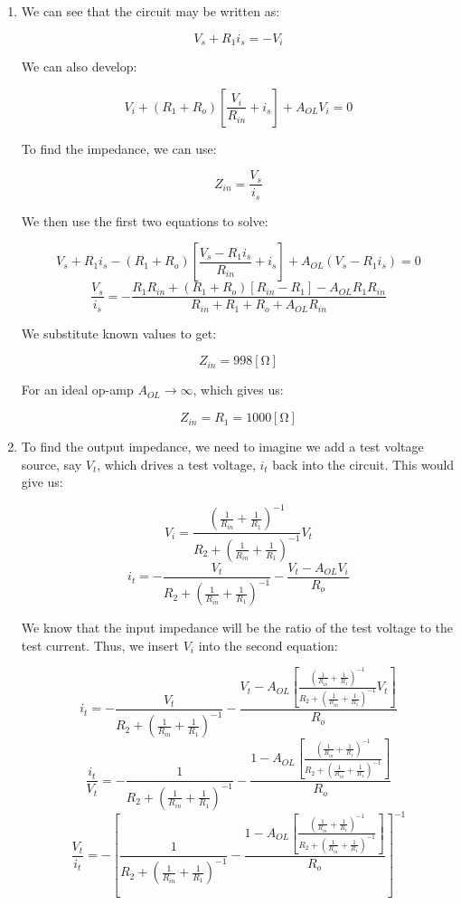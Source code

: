 \begin{enumerate}
\begin{enumerate}
      \item 

        We can see that the circuit may be written as:

        $$V_s+R_1i_s=-V_i$$

        We can also develop:

        $$V_i+(R_1+R_o)\left[ \frac{V_i}{R_{in}}+i_s \right]+A_{OL}V_i=0$$

        To find the impedance, we can use:

        $$Z_{in}=\frac{V_s}{i_s}$$

        We then use the first two equations to solve:

        $$V_s+R_1i_s-(R_1+R_o)\left[ \frac{V_s-R_1i_s}{R_{in}}+i_s\right]+A_{OL}(V_s-R_1i_s)=0$$
        $$\frac{V_s}{i_s}=-\frac{R_1R_{in}+(R_1+R_o)\left[ R_{in}-R_1 \right]-A_{OL}R_1R_{in}}{R_{in}+R_1+R_o+A_{OL}R_{in}}$$

        We substitute known values to get:

        $$\boxed{Z_{in}=998[\si{\ohm}]}$$

        For an ideal op-amp $A_{OL}\to\infty$, which gives us:

        $$\boxed{Z_{in}=R_1=1000[\si{\ohm}]}$$

      \item 

        To find the output impedance, we need to imagine we add a test voltage source, say $V_t$, which drives a test voltage, $i_t$ back into the circuit. This would give us:

        $$V_i=\frac{\left( \frac{1}{R_{in}}+\frac{1}{R_1} \right)^{-1}}{R_2+\left( \frac{1}{R_{in}}+\frac{1}{R_1} \right)^{-1}}V_t$$
        $$i_t=-\frac{V_t}{R_2+\left( \frac{1}{R_{in}}+\frac{1}{R_1} \right)^{-1}}-\frac{V_t-A_{OL}V_i}{R_o}$$

        We know that the input impedance will be the ratio of the test voltage to the test current. Thus, we insert $V_i$ into the second equation:

        $$i_t=-\frac{V_t}{R_2+\left( \frac{1}{R_{in}}+\frac{1}{R_1} \right)^{-1}}-\frac{V_t-A_{OL}\left[\frac{\left( \frac{1}{R_{in}}+\frac{1}{R_1} \right)^{-1}}{R_2+\left( \frac{1}{R_{in}}+\frac{1}{R_1} \right)^{-1}}V_t\right]}{R_o}$$
        $$\frac{i_t}{V_t}=-\frac{1}{R_2+\left( \frac{1}{R_{in}}+\frac{1}{R_1} \right)^{-1}}-\frac{1-A_{OL}\left[\frac{\left( \frac{1}{R_{in}}+\frac{1}{R_1} \right)^{-1}}{R_2+\left( \frac{1}{R_{in}}+\frac{1}{R_1} \right)^{-1}}\right]}{R_o}$$
        $$\frac{V_t}{i_t}=-\left[\frac{1}{R_2+\left( \frac{1}{R_{in}}+\frac{1}{R_1} \right)^{-1}}-\frac{1-A_{OL}\left[\frac{\left( \frac{1}{R_{in}}+\frac{1}{R_1} \right)^{-1}}{R_2+\left( \frac{1}{R_{in}}+\frac{1}{R_1} \right)^{-1}}\right]}{R_o}\right]^{-1}$$


\end{enumerate}
\end{enumerate}
